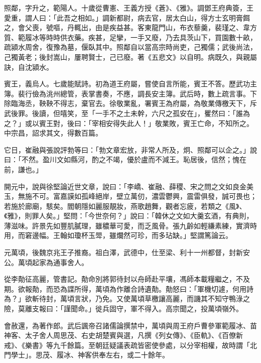 \begin{pinyinscope}
 照鄰，字升之，範陽人。十歲從曹憲、王義方授《蒼》、《雅》。調鄧王府典簽，王愛重，謂人曰：「此吾之相如。」調新都尉，病去官，居太白山，得方士玄明膏餌之，會父喪，號嘔，丹輒出，由是疾益甚。客東龍門山，布衣藜羹，裴瑾之、韋方質、範履冰等時時供衣藥。疾甚，足攣，一手又廢，乃去具茨山下，買園數十畝，疏潁水周舍，復豫為墓，偃臥其中。照鄰自以當高宗時尚吏，己獨儒；武後尚法，己獨黃老；後封嵩山，屢聘賢士，己已廢。著《五悲文》以自明。病既久，與親屬訣，自沈潁水。



 賓王，義烏人。七歲能賦詩。初為道王府屬，嘗使自言所能，賓王不答。歷武功主簿。裴行儉為洮州總管，表掌書奏，不應，調長安主簿。武后時，數上疏言事。下除臨海丞，鞅鞅不得志，棄官去。徐敬業亂，署賓王為府屬，為敬業傳檄天下，斥武後罪。後讀，但嘻笑，至「一手不之土未幹，六尺之孤安在」，矍然曰：「誰為之？」或以賓王對，後曰：「宰相安得失此人！」敬業敗，賓王亡命，不知所之。中宗昌，詔求其文，得數百篇。



 它日，崔融與張說評勃等曰：「勃文章宏放，非常人所及，炯、照鄰可以企之。」說曰：「不然。盈川文如縣河，酌之不竭，優於盧而不減王。恥居後，信然；愧在前，謙也。」



 開元中，說與徐堅論近世文章，說曰：「李嶠、崔融、薛稷、宋之問之文如良金美玉，無施不可。富嘉謨如孤峰絕岸，壁立萬仞，濃雲鬱興，震雷俱發，誠可畏也；若施於廊廟，駭矣。閻朝隱如麗服靚妝，燕歌趙舞，觀者忘疲，若類之《風》、《雅》，則罪人矣。」堅問：「今世奈何？」說曰：「韓休之文如大羹玄酒，有典則，薄滋味。許景先如豐肌膩理，雖穠華可愛，而乏風骨。張九齡如輕縑素練，實濟時用，而窘邊幅。王翰如瓊杯玉斝，雖爛然可珍，而多玷缺。」堅謂篤論云。



 元萬頃，後魏京兆王子推裔。祖白澤，武德中，仕至梁、利十一州都督，封新安公。萬頃起家為通事舍人。



 從李勣征高麗，管書記。勣命別將郭待封以舟師赴平壤，馮師本載糧繼之，不及期。欲報勣，而恐為諜所得，萬頃為作離合詩遺勣。勣怒曰：「軍機切遽，何用詩為？」欲斬待封，萬頃言狀，乃免。又使萬頃草檄讓高麗，而譏其不知守鴨淥之險，莫離支報曰：「謹聞命。」徙兵固守，軍不得入。高宗聞之，投萬頃嶺外。



 會赦還，為著作郎。武后諷帝召諸儒論撰禁中，萬頃與周王府戶曹參軍範履冰、苗神客、太子舍人周思茂、右史胡楚賓與選，凡撰《列女傳》、《臣軌》、《百僚新戒》、《樂書》等九千餘篇。至朝廷疑議表疏皆密使參處，以分宰相權，故時謂「北門學士」。思茂、履冰、神客供奉左右，或二十餘年。




\end{pinyinscope}
